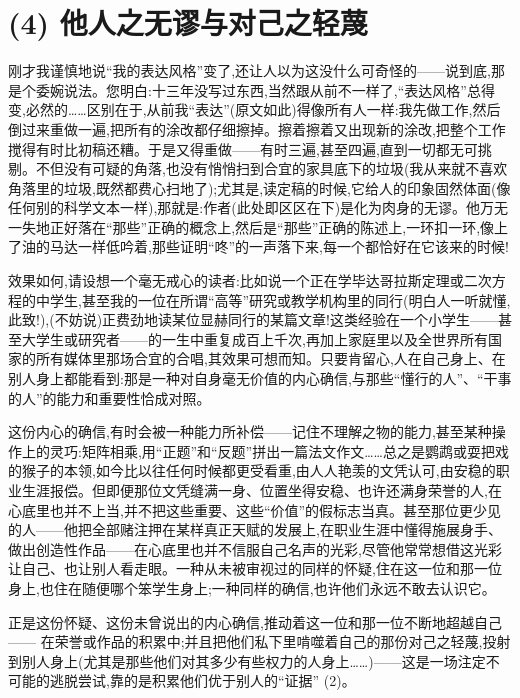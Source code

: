 \section{(4) 他人之无谬与对己之轻蔑}

 刚才我谨慎地说“我的表达风格”变了,还让人以为这没什么可奇怪的——说到底,那是个委婉说法。您明白:十三年没写过东西,当然跟从前不一样了,“表达风格”总得变,必然的……区别在于,从前我“表达”(原文如此)得像所有人一样:我先做工作,然后倒过来重做一遍,把所有的涂改都仔细擦掉。擦着擦着又出现新的涂改,把整个工作搅得有时比初稿还糟。于是又得重做——有时三遍,甚至四遍,直到一切都无可挑剔。不但没有可疑的角落,也没有悄悄扫到合宜的家具底下的垃圾(我从来就不喜欢角落里的垃圾,既然都费心扫地了);尤其是,读定稿的时候,它给人的印象固然体面(像任何别的科学文本一样),那就是:作者(此处即区区在下)是化为肉身的无谬。他万无一失地正好落在“那些”正确的概念上,然后是“那些”正确的陈述上,一环扣一环,像上了油的马达一样低吟着,那些证明“咚”的一声落下来,每一个都恰好在它该来的时候!

 效果如何,请设想一个毫无戒心的读者:比如说一个正在学毕达哥拉斯定理或二次方程的中学生,甚至我的一位在所谓“高等”研究或教学机构里的同行(明白人一听就懂,此致!),(不妨说)正费劲地读某位显赫同行的某篇文章!这类经验在一个小学生——甚至大学生或研究者——的一生中重复成百上千次,再加上家庭里以及全世界所有国家的所有媒体里那场合宜的合唱,其效果可想而知。只要肯留心,人在自己身上、在别人身上都能看到:那是一种对自身毫无价值的内心确信,与那些“懂行的人”、“干事的人”的能力和重要性恰成对照。

这份内心的确信,有时会被一种能力所补偿——记住不理解之物的能力,甚至某种操作上的灵巧:矩阵相乘,用“正题”和“反题”拼出一篇法文作文……总之是鹦鹉或耍把戏的猴子的本领,如今比以往任何时候都更受看重,由人人艳羡的文凭认可,由安稳的职业生涯报偿。但即便那位文凭缝满一身、位置坐得安稳、也许还满身荣誉的人,在心底里也并不上当,并不把这些重要、这些“价值”的假标志当真。甚至那位更少见的人——他把全部赌注押在某样真正天赋的发展上,在职业生涯中懂得施展身手、做出创造性作品——在心底里也并不信服自己名声的光彩,尽管他常常想借这光彩让自己、也让别人看走眼。一种从未被审视过的同样的怀疑,住在这一位和那一位身上,也住在随便哪个笨学生身上;一种同样的确信,也许他们永远不敢去认识它。

正是这份怀疑、这份未曾说出的内心确信,推动着这一位和那一位不断地超越自己——
在荣誉或作品的积累中;并且把他们私下里啃噬着自己的那份对己之轻蔑,投射到别人身上(尤其是那些他们对其多少有些权力的人身上……)——这是一场注定不可能的逃脱尝试,靠的是积累他们优于别人的“证据” (2)。
